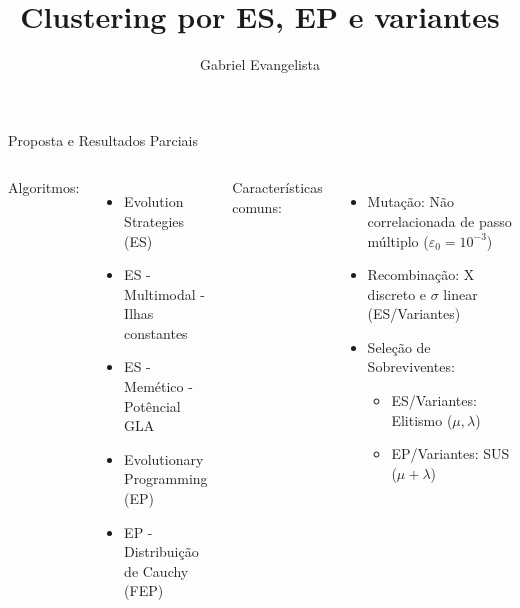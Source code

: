 \documentclass[pdf]{beamer}
\title{Clustering por ES, EP e variantes}
\author{Gabriel Evangelista}
\begin{document}
\begin{frame}{Proposta e Resultados Parciais}
	\begin{columns}
		Algoritmos:
		\begin{itemize}
			\item Evolution Strategies (ES) 
			\item ES - Multimodal - Ilhas constantes
			\item ES - Memético - Potêncial GLA
			\item Evolutionary Programming (EP)
			\item EP - Distribuição de Cauchy (FEP)
		\end{itemize}
	
	
		Características comuns:
		\begin{itemize}
			\item Mutação: Não correlacionada de passo múltiplo ($ \varepsilon_0 = 10^{-3} $)
			\item Recombinação: X discreto e $ \sigma $ linear (ES/Variantes)
			\item Seleção de Sobreviventes:
			\begin{itemize}
				\item ES/Variantes: Elitismo ($ \mu, \lambda $)
				\item EP/Variantes: SUS ($ \mu + \lambda $)
			\end{itemize}
		\end{itemize}



\end{columns}
\end{frame}
\end{document}
